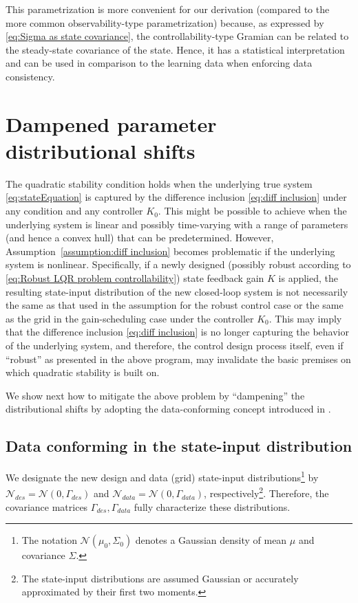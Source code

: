 \documentclass[letterpaper, 10 pt, conference]{ieeeconf}
\begin{document}
This parametrization is more convenient for our derivation (compared to the more common observability-type parametrization) because, as expressed by \eqref{eq:Sigma as state covariance}, the controllability-type Gramian can be related to the steady-state covariance of the state. Hence, it has a statistical interpretation and can be used in comparison to the learning data when enforcing data consistency.

\section{Dampened parameter distributional shifts}
The quadratic stability condition holds when the underlying true system \eqref{eq:stateEquation} is captured by the difference inclusion \eqref{eq:diff inclusion} under any condition and any controller $K_0$. This might be possible to achieve when the underlying system is linear and possibly time-varying with a range of parameters (and hence a convex hull) that can be predetermined. However, Assumption~\ref{assumption:diff inclusion} becomes problematic if the underlying system is nonlinear. Specifically, if a newly designed (possibly robust according to \eqref{eq:Robust LQR problem controllability}) state feedback gain $K$ is applied, the resulting state-input distribution of the new closed-loop system is not necessarily the same as that used in the assumption for the robust control case or the same as the grid in the gain-scheduling case under the controller $K_0$. This may imply that the difference inclusion \ref{eq:diff inclusion} is no longer capturing the behavior of the underlying system, and therefore, the control design process itself, even if ``robust'' as presented in the above program, may invalidate the basic premises on which quadratic stability is built on.

We show next how to mitigate the above problem by ``dampening'' the distributional shifts by adopting the data-conforming concept introduced in \cite{ramadan2024data}.

\subsection{Data conforming in the state-input distribution}
We designate the new design and data (grid) state-input distributions\footnote{The notation $ \mathcal{N}(\mu_0, \Sigma_0)$ denotes a Gaussian density of mean $\mu$ and covariance $\Sigma$.} by $\mathcal{N}_{des} =  \mathcal{N}(0, \Gamma_{des})$ and $\mathcal{N}_{data} =  \mathcal{N}(0, \Gamma_{data})$, respectively\footnote{The state-input distributions are assumed Gaussian or accurately approximated by their first two moments.}. Therefore, the covariance matrices $\Gamma_{des},\Gamma_{data}$ fully characterize these distributions.
\end{document}
